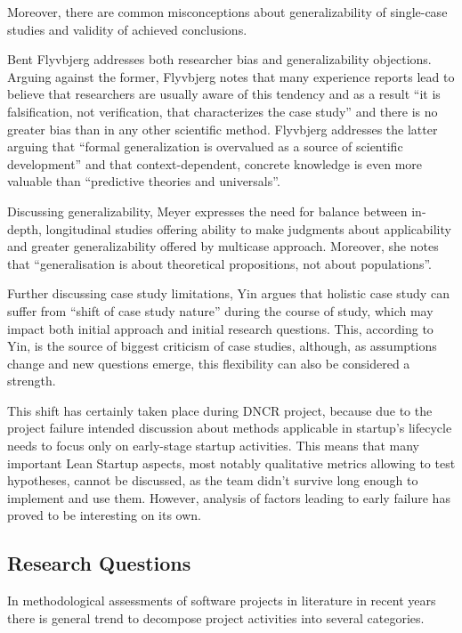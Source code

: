 \documentclass{article}
\begin{document}
Moreover, there are common misconceptions about generalizability of single-case studies and validity of achieved conclusions.

Bent Flyvbjerg \cite{flyvbjerg2006five} addresses both researcher bias and generalizability objections. Arguing against the former, Flyvbjerg notes that many experience reports lead to believe that researchers are usually aware of this tendency and as a result ``it is falsification, not verification, that characterizes the case study'' and there is no greater bias than in any other scientific method. Flyvbjerg addresses the latter arguing that ``formal generalization is overvalued as a source of scientific development'' and that context-dependent, concrete knowledge is even more valuable than ``predictive theories and universals''.

Discussing generalizability, Meyer \cite{meyer2001case} expresses the need for balance between in-depth, longitudinal studies offering ability to make judgments about applicability and greater generalizability offered by multicase approach. Moreover, she notes that ``generalisation is about theoretical propositions, not about populations''.

Further discussing case study limitations, Yin \cite{yin2013case} argues that holistic case study can suffer from ``shift of case study nature'' during the course of study, which may impact both initial approach and initial research questions. This, according to Yin, is the source of biggest criticism of case studies, although, as assumptions change and new questions emerge, this flexibility can also be considered a strength.

This shift has certainly taken place during DNCR project, because due to the project failure intended discussion about methods applicable in startup's lifecycle needs to focus only on early-stage startup activities. This means that many important Lean Startup aspects, most notably qualitative metrics allowing to test hypotheses, cannot be discussed, as the team didn't survive long enough to implement and use them. However, analysis of factors leading to early failure has proved to be interesting on its own.

\subsection{Research Questions}
In methodological assessments of software projects in literature in recent years there is general trend to decompose project activities into several categories.
\end{document}
